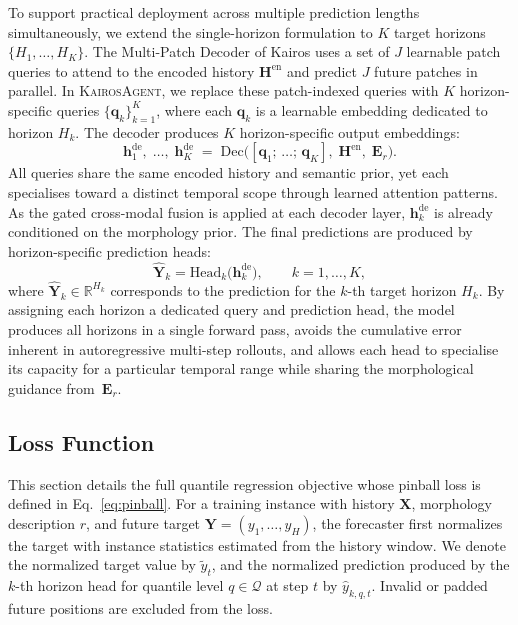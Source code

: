 \documentclass[11pt]{article}
\newcommand{\method}{\textsc{KairosAgent}\xspace}
\begin{document}
To support practical deployment across multiple prediction lengths simultaneously, we extend the single-horizon formulation to $K$ target horizons $\{H_1, \ldots, H_K\}$.
The Multi-Patch Decoder of Kairos uses a set of $J$ learnable patch queries to attend to the encoded history $\boldsymbol{H}^{\mathrm{en}}$ and predict $J$ future patches in parallel.
In \method, we replace these patch-indexed queries with $K$ horizon-specific queries $\{\mathbf{q}_k\}_{k=1}^{K}$, where each $\mathbf{q}_k$ is a learnable embedding dedicated to horizon $H_k$.
The decoder produces $K$ horizon-specific output embeddings:
\begin{equation}
    \boldsymbol{h}_{1}^{\mathrm{de}},\;\ldots,\;\boldsymbol{h}_{K}^{\mathrm{de}}
    \;=\;
    \mathrm{Dec}\bigl(
        [\mathbf{q}_{1};\,\ldots;\,\mathbf{q}_{K}],\;
        \boldsymbol{H}^{\mathrm{en}},\;
        \boldsymbol{E}_r
    \bigr).
\end{equation}
All queries share the same encoded history and semantic prior, yet each specialises toward a distinct temporal scope through learned attention patterns.
As the gated cross-modal fusion is applied at each decoder layer, $\boldsymbol{h}_{k}^{\mathrm{de}}$ is already conditioned on the morphology prior.
The final predictions are produced by horizon-specific prediction heads:
\begin{equation}
    \hat{\mathbf{Y}}_{k}
    = \mathrm{Head}_{k}\bigl(\boldsymbol{h}_{k}^{\mathrm{de}}\bigr),
    \qquad k=1,\ldots,K,
\end{equation}
where $\hat{\mathbf{Y}}_{k}\in\mathbb{R}^{H_k}$ corresponds to the prediction for the $k$-th target horizon $H_k$.
By assigning each horizon a dedicated query and prediction head, the model produces all horizons in a single forward pass, avoids the cumulative error inherent in autoregressive multi-step rollouts, and allows each head to specialise its capacity for a particular temporal range while sharing the morphological guidance from~$\boldsymbol{E}_r$.


\subsection{Loss Function}
\label{app:loss}

This section details the full quantile regression objective whose pinball loss is defined in Eq.~\eqref{eq:pinball}.
For a training instance with history $\mathbf{X}$, morphology description $r$, and future target $\mathbf{Y}=(y_1,\ldots,y_H)$, the forecaster first normalizes the target with instance statistics estimated from the history window.
We denote the normalized target value by $\tilde{y}_t$, and the normalized prediction produced by the $k$-th horizon head for quantile level $q\in\mathcal{Q}$ at step $t$ by $\hat{y}_{k,q,t}$.
Invalid or padded future positions are excluded from the loss.
\end{document}
